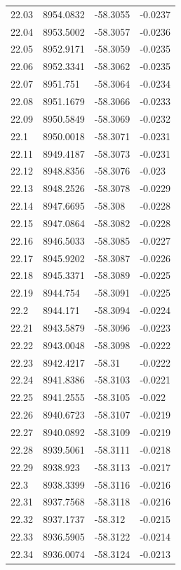 \begin{table}[H]
\begin{tabular}{llll}
22.03 & 8954.0832 & -58.3055 & -0.0237 \\
22.04 & 8953.5002 & -58.3057 & -0.0236 \\
22.05 & 8952.9171 & -58.3059 & -0.0235 \\
22.06 & 8952.3341 & -58.3062 & -0.0235 \\
22.07 & 8951.751 & -58.3064 & -0.0234 \\
22.08 & 8951.1679 & -58.3066 & -0.0233 \\
22.09 & 8950.5849 & -58.3069 & -0.0232 \\
22.1 & 8950.0018 & -58.3071 & -0.0231 \\
22.11 & 8949.4187 & -58.3073 & -0.0231 \\
22.12 & 8948.8356 & -58.3076 & -0.023 \\
22.13 & 8948.2526 & -58.3078 & -0.0229 \\
22.14 & 8947.6695 & -58.308 & -0.0228 \\
22.15 & 8947.0864 & -58.3082 & -0.0228 \\
22.16 & 8946.5033 & -58.3085 & -0.0227 \\
22.17 & 8945.9202 & -58.3087 & -0.0226 \\
22.18 & 8945.3371 & -58.3089 & -0.0225 \\
22.19 & 8944.754 & -58.3091 & -0.0225 \\
22.2 & 8944.171 & -58.3094 & -0.0224 \\
22.21 & 8943.5879 & -58.3096 & -0.0223 \\
22.22 & 8943.0048 & -58.3098 & -0.0222 \\
22.23 & 8942.4217 & -58.31 & -0.0222 \\
22.24 & 8941.8386 & -58.3103 & -0.0221 \\
22.25 & 8941.2555 & -58.3105 & -0.022 \\
22.26 & 8940.6723 & -58.3107 & -0.0219 \\
22.27 & 8940.0892 & -58.3109 & -0.0219 \\
22.28 & 8939.5061 & -58.3111 & -0.0218 \\
22.29 & 8938.923 & -58.3113 & -0.0217 \\
22.3 & 8938.3399 & -58.3116 & -0.0216 \\
22.31 & 8937.7568 & -58.3118 & -0.0216 \\
22.32 & 8937.1737 & -58.312 & -0.0215 \\
22.33 & 8936.5905 & -58.3122 & -0.0214 \\
22.34 & 8936.0074 & -58.3124 & -0.0213 \\

\end{tabular}
\end{table}
